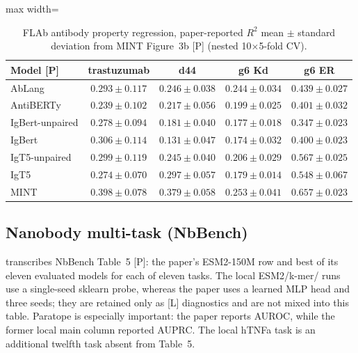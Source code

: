 \begin{table}[t]
\centering
\caption{FLAb antibody property regression, paper-reported $R^2$ mean
$\pm$ standard deviation from MINT Figure~3b [P] (nested 10$\times$5-fold CV).}
\label{tab:ab-flab}
\small
\setlength{\tabcolsep}{4pt}
\begin{adjustbox}{max width=\textwidth}
\begin{tabular}{@{}lcccc@{}}
\toprule
Model [P] & trastuzumab & d44 & g6 Kd & g6 ER \\
\midrule
AbLang          & $0.293\pm0.117$ & $0.246\pm0.038$ & $0.244\pm0.034$ & $0.439\pm0.027$ \\
AntiBERTy       & $0.239\pm0.102$ & $0.217\pm0.056$ & $0.199\pm0.025$ & $0.401\pm0.032$ \\
IgBert-unpaired & $0.278\pm0.094$ & $0.181\pm0.040$ & $0.177\pm0.018$ & $0.347\pm0.023$ \\
IgBert          & $0.306\pm0.114$ & $0.131\pm0.047$ & $0.174\pm0.032$ & $0.400\pm0.023$ \\
IgT5-unpaired   & $0.299\pm0.119$ & $0.245\pm0.040$ & $0.206\pm0.029$ & $0.567\pm0.025$ \\
IgT5            & $0.274\pm0.070$ & $0.297\pm0.057$ & $0.179\pm0.014$ & $0.548\pm0.067$ \\
MINT            & $0.398\pm0.078$ & $0.379\pm0.058$ & $0.253\pm0.041$ & $0.657\pm0.023$ \\
\bottomrule
\end{tabular}
\end{adjustbox}
\end{table}

\subsection{Nanobody multi-task (NbBench)}
\label{sec:nbbench}

 transcribes NbBench Table~5 [P]: the paper's ESM2-150M row
and best of its eleven evaluated models for each of eleven tasks. The local
ESM2/k-mer/\Ours{} runs use a single-seed sklearn probe, whereas the paper uses
a learned MLP head and three seeds; they are retained only as [L] diagnostics
and are not mixed into this table. Paratope is especially important: the paper
reports AUROC, while the former local main column reported AUPRC. The local
hTNFa task is an additional twelfth task absent from Table~5.


